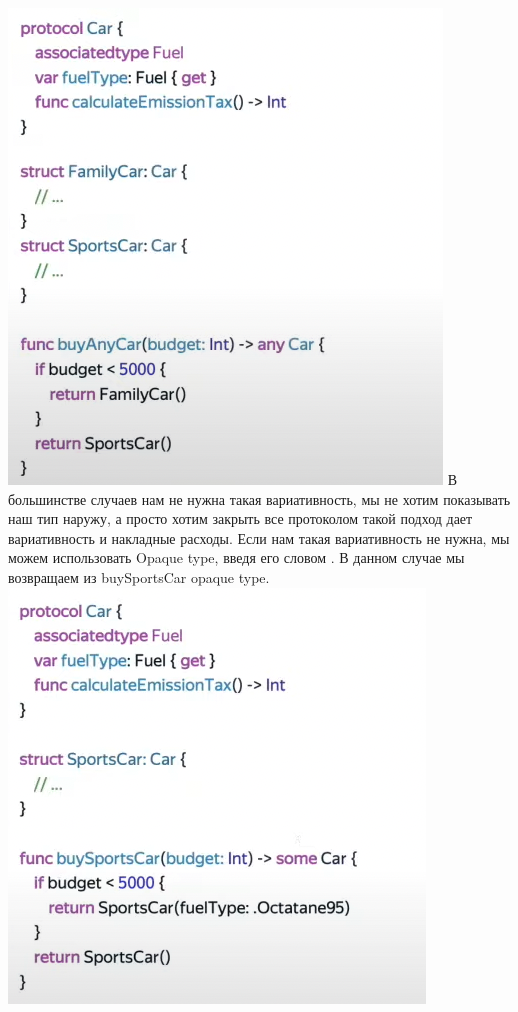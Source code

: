 \documentclass{article}
\begin{document}
    \includegraphics[scale = 0.5]{pic/Снимок экрана 2023-07-28 в 23.02.24.png}
    \newline
    В большинстве случаев нам не нужна такая вариативность, мы не хотим показывать наш тип наружу, а просто хотим закрыть все протоколом такой подход дает вариативность и накладные расходы. Если нам такая вариативность не нужна, мы можем использовать  Opaque type, введя его словом . В данном случае мы возвращаем из buySportsCar opaque type.
    \newline
    \includegraphics[scale = 0.5]{pic/Снимок экрана 2023-07-28 в 23.05.35.png}
\end{document}
